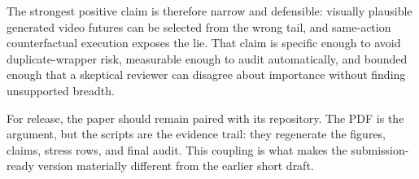 \documentclass{article}
\begin{document}
The strongest positive claim is therefore narrow and defensible: visually plausible generated video futures can be selected from the wrong tail, and same-action counterfactual execution exposes the lie. That claim is specific enough to avoid duplicate-wrapper risk, measurable enough to audit automatically, and bounded enough that a skeptical reviewer can disagree about importance without finding unsupported breadth.

For release, the paper should remain paired with its repository. The PDF is the argument, but the scripts are the evidence trail: they regenerate the figures, claims, stress rows, and final audit. This coupling is what makes the submission-ready version materially different from the earlier short draft.
\end{document}
